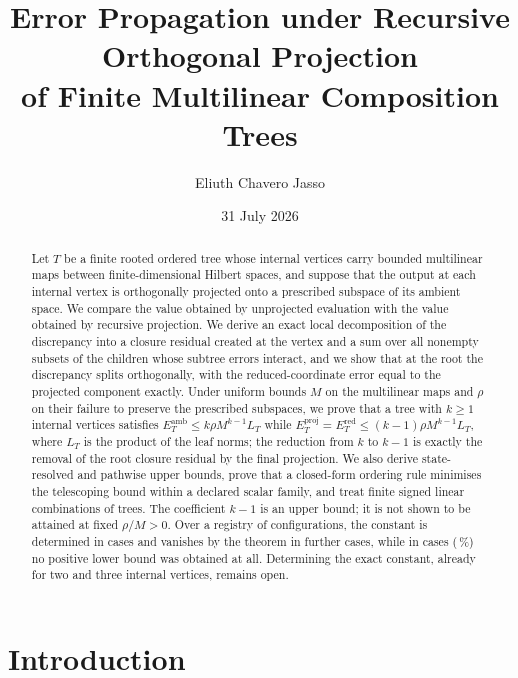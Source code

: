 \documentclass[11pt]{amsart}
\title[Error propagation under recursive orthogonal projection]{Error Propagation under Recursive Orthogonal Projection\\ of Finite Multilinear Composition Trees}
\author{Eliuth Chavero Jasso}
\date{31 July 2026}
\theoremstyle{definition}
\theoremstyle{remark}
\newcommand{\amb}{\mathrm{amb}}
\newcommand{\proj}{\mathrm{proj}}
\newcommand{\red}{\mathrm{red}}
\begin{document}
\begin{abstract}
Let $T$ be a finite rooted ordered tree whose internal vertices carry bounded multilinear
maps between finite-dimensional Hilbert spaces, and suppose that the output at each
internal vertex is orthogonally projected onto a prescribed subspace of its ambient
space. We compare the value obtained by unprojected evaluation with the value obtained
by recursive projection. We derive an exact local decomposition of the discrepancy into a
closure residual created at the vertex and a sum over all nonempty subsets of the
children whose subtree errors interact, and we show that at the root the discrepancy
splits orthogonally, with the reduced-coordinate error equal to the projected component
exactly. Under uniform bounds $M$ on the multilinear maps and $\rho$ on their failure to
preserve the prescribed subspaces, we prove that a tree with $k\ge1$ internal vertices
satisfies $E_T^{\amb}\le k\rho M^{k-1}L_T$ while $E_T^{\proj}=E_T^{\red}\le(k-1)\rho
M^{k-1}L_T$, where $L_T$ is the product of the leaf norms; the reduction from $k$ to
$k-1$ is exactly the removal of the root closure residual by the final projection. We
also derive state-resolved and pathwise upper bounds, prove that a closed-form ordering
rule minimises the telescoping bound within a declared scalar family, and treat finite
signed linear combinations of trees. The coefficient $k-1$ is an upper bound; it is not
shown to be attained at fixed $\rho/M>0$. Over a registry of \VThreeGapRegistryRows{}
configurations, the constant is determined in \VThreeDeterminedPositive{} cases and
vanishes by the theorem in \VThreeZeroByTheorem{} further cases, while in
\VThreeNoPositiveLowerBound{} cases (\VThreeNoPositiveLowerPercent{}\,\%) no positive
lower bound was obtained at all. Determining the exact constant, already for two and
three internal vertices, remains open.
\end{abstract}

\maketitle

\section{Introduction}
\label{sec:intro}
\end{document}

